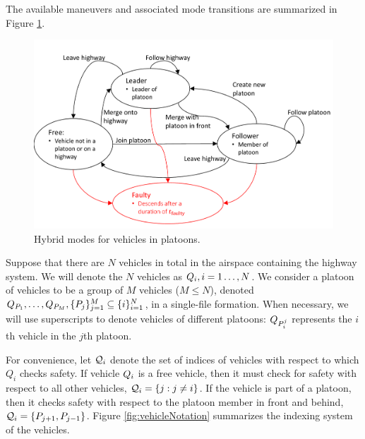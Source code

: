\begin{itemize}
\end{itemize}

The available maneuvers and associated mode transitions are summarized in Figure \ref{fig:vehicleModes}.

\begin{figure}
	\centering
	\includegraphics[width=\columnwidth]{"fig/vehicleModes"}
	\caption{Hybrid modes for vehicles in platoons. }
	\label{fig:vehicleModes}
\end{figure}

Suppose that there are $N$ vehicles in total in the airspace containing the highway system. We will denote the $N$ vehicles as $Q_{i}, i=1\ldots,N$. We consider a platoon of vehicles to be a group of $M$ vehicles ($M\le N$), denoted $Q_{P_1}, \ldots, Q_{P_M}, \{P_j\}_{j=1}^M \subseteq \{i\}_{i=1}^N$, in a single-file formation. When necessary, we will use superscripts to denote vehicles of different platoons: $Q_{P_i^j}$ represents the $i$th vehicle in the $j$th platoon. 

For convenience, let $\mathcal{Q}_{i}$ denote the set of indices of vehicles with respect to which $Q_i$ checks safety. If vehicle $Q_{i}$ is a free vehicle, then it must check for safety with respect to all other vehicles, $\mathcal{Q}_{i} = \{j: j\neq i\}$. If the vehicle is part of a platoon, then it checks safety with respect to the platoon member in front and behind, $\mathcal{Q}_{i} = \{P_{j+1}, P_{j-1}\}$. Figure \ref{fig:vehicleNotation} summarizes the indexing system of the vehicles.

